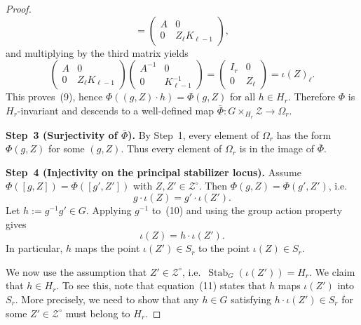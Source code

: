 \documentclass{article}
\theoremstyle{definition}
\begin{document}
\begin{proof}
\[= \begin{pmatrix} A & 0 \\ 0 & Z_\ell K_{\ell-1} \end{pmatrix},
\]
and multiplying by the third matrix yields
\[
\begin{pmatrix} A & 0 \\ 0 & Z_\ell K_{\ell-1} \end{pmatrix}
\begin{pmatrix} A^{-1} & 0 \\ 0 & K_{\ell-1}^{-1} \end{pmatrix}
= \begin{pmatrix} I_r & 0 \\ 0 & Z_\ell \end{pmatrix}
= \iota(Z)_\ell.
\]
This proves~(9), hence $\Phi((g, Z) \cdot h) = \Phi(g, Z)$ for all $h \in H_r$. Therefore $\Phi$ is $H_r$-invariant and descends to a well-defined map $\bar\Phi \colon G \times_{H_r} \mathcal{Z} \to \Omega_r$.

\medskip
\textbf{Step~3 (Surjectivity of $\bar\Phi$).} By Step~1, every element of $\Omega_r$ has the form $\Phi(g, Z)$ for some $(g, Z)$. Thus every element of $\Omega_r$ is in the image of $\bar\Phi$.

\medskip
\textbf{Step~4 (Injectivity on the principal stabilizer locus).}
Assume $\Phi([g, Z]) = \Phi([g', Z'])$ with $Z, Z' \in \mathcal{Z}^{\circ}$. Then $\Phi(g, Z) = \Phi(g', Z')$, i.e.
\begin{equation}\tag{10}
g \cdot \iota(Z) = g' \cdot \iota(Z').
\end{equation}
Let $h := g^{-1} g' \in G$. Applying $g^{-1}$ to~(10) and using the group action property gives
\begin{equation}\tag{11}
\iota(Z) = h \cdot \iota(Z').
\end{equation}
In particular, $h$ maps the point $\iota(Z') \in S_r$ to the point $\iota(Z) \in S_r$.

We now use the assumption that $Z' \in \mathcal{Z}^{\circ}$, i.e.\ $\operatorname{Stab}_G(\iota(Z')) = H_r$.  We claim that $h \in H_r$.  To see this, note that equation~(11) states that $h$ maps $\iota(Z')$ into $S_r$.  More precisely, we need to show that any $h \in G$ satisfying $h \cdot \iota(Z') \in S_r$ for some $Z' \in \mathcal{Z}^{\circ}$ must belong to $H_r$.


\end{proof}
\end{document}
